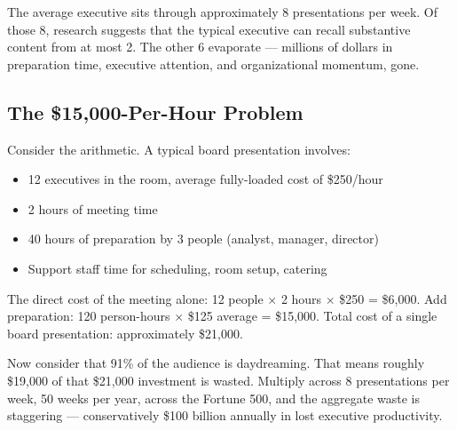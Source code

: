 The average executive sits through approximately 8 presentations per week. Of those 8, research suggests that the typical executive can recall substantive content from at most 2. The other 6 evaporate --- millions of dollars in preparation time, executive attention, and organizational momentum, gone.

\subsection{The \$15,000-Per-Hour Problem}

Consider the arithmetic. A typical board presentation involves:

\begin{itemize}
  \item 12 executives in the room, average fully-loaded cost of \$250/hour
  \item 2 hours of meeting time
  \item 40 hours of preparation by 3 people (analyst, manager, director)
  \item Support staff time for scheduling, room setup, catering
\end{itemize}

The direct cost of the meeting alone: 12 people $\times$ 2 hours $\times$ \$250 = \$6,000. Add preparation: 120 person-hours $\times$ \$125 average = \$15,000. Total cost of a single board presentation: approximately \$21,000.

Now consider that 91\% of the audience is daydreaming. That means roughly \$19,000 of that \$21,000 investment is wasted. Multiply across 8 presentations per week, 50 weeks per year, across the Fortune 500, and the aggregate waste is staggering --- conservatively \$100 billion annually in lost executive productivity.

